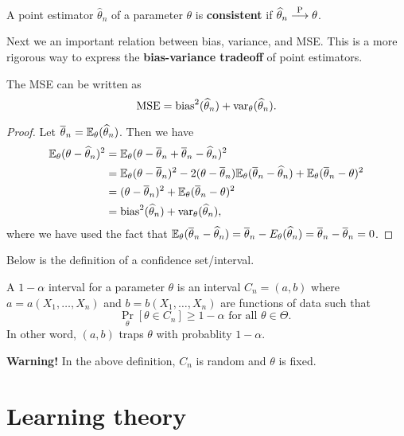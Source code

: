 \documentclass[a4paper]{article}
\begin{document}
\begin{defi}
  A point estimator $\hat\theta_n$ of a parameter
  $\theta$ is \textbf{consistent} if $\widehat{\theta}_n
  \overset{\mathrm{P}}{\longrightarrow} \theta$.
\end{defi}

Next we an important relation between bias, variance,
and MSE. This is a more rigorous way to express the
\textbf{bias-variance tradeoff} of point estimators.

\begin{thm}
The MSE can be written as
\[
\operatorname{MSE} = \operatorname{bias}^2 (\widehat{\theta}_n) + \operatorname{var}_\theta (\widehat{\theta}_n).
\]
\end{thm}

\begin{proof}
  Let $\overline{\theta}_n = \mathbb{E}_\theta (\widehat{\theta}_n)$.
  Then we have
  \[
  \begin{aligned}
    \mathbb{E}_\theta(\theta - \widehat{\theta}_n)^2
    &= \mathbb{E}_\theta(\theta - \overline{\theta}_n + \overline{\theta}_n
    - \widehat{\theta}_n)^2 \\
    &= \mathbb{E}_\theta(\theta - \overline{\theta}_n)^2
    - 2 (\theta - \overline{\theta}_n) \mathbb{E}_\theta (\overline{\theta}_n -
    \widehat{\theta}_n)
    + \mathbb{E}_\theta (\overline{\theta}_n - \theta)^2 \\
    &= (\theta - \overline{\theta}_n)^2
    + \mathbb{E}_\theta (\overline{\theta}_n - \theta)^2 \\
    &= \operatorname{bias}^2(\widehat{\theta}_n) + \operatorname{var}_\theta (\widehat{\theta}_n),
  \end{aligned}
  \]
  where we have used the fact that
  $\mathbb{E}_\theta (\overline{\theta}_n -
  \widehat{\theta}_n) = \overline{\theta}_n - E_\theta(\widehat{\theta}_n)
  = \overline{\theta}_n - \overline{\theta}_n = 0$.
\end{proof}

Below is the definition of a confidence set/interval.

\begin{defi}
  A $1 - \alpha$ interval for a parameter $\theta$ is
  an interval $C_n = (a, b)$ where
  $a = a(X_1, \dots, X_n)$ and $b = b(X_1, \dots, X_n)$
  are functions of data such that
  \[
  \Pr_\theta[\theta \in C_n] \geq 1 - \alpha
  \text{ for all $\theta \in \Theta$. }
  \]
  In other word, $(a, b)$ traps $\theta$ with probablity
  $1 - \alpha$.
\end{defi}

\textbf{Warning!} In the above definition,
$C_n$ is random and $\theta$ is fixed.

\section{Learning theory}
\end{document}

